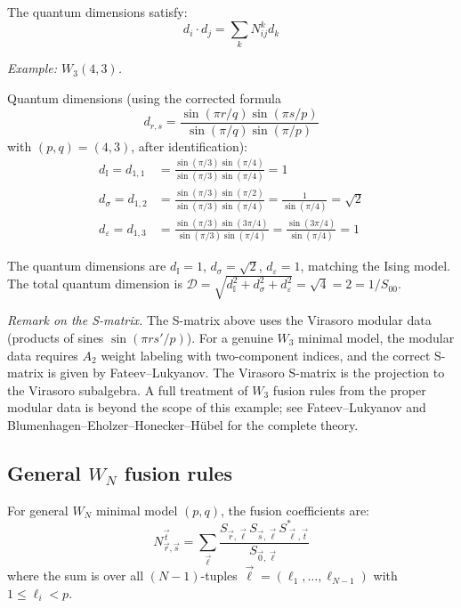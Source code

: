 \begin{verification}\label{verif:quantum-dim-mult}
The quantum dimensions satisfy:
\[d_i \cdot d_j = \sum_k N_{ij}^k d_k\]

\emph{Example: $W_3(4,3)$.}

Quantum dimensions (using the corrected formula
\[
d_{r,s} = \frac{\sin(\pi r/q)\sin(\pi s/p)}{\sin(\pi/q)\sin(\pi/p)}
\]
with $(p,q) = (4,3)$, after identification):
\begin{align}
d_{\mathbb{I}} = d_{1,1} &= \frac{\sin(\pi/3)\sin(\pi/4)}{\sin(\pi/3)\sin(\pi/4)} = 1 \\
d_{\sigma} = d_{1,2} &= \frac{\sin(\pi/3)\sin(\pi/2)}{\sin(\pi/3)\sin(\pi/4)} = \frac{1}{\sin(\pi/4)} = \sqrt{2} \\
d_{\varepsilon} = d_{1,3} &= \frac{\sin(\pi/3)\sin(3\pi/4)}{\sin(\pi/3)\sin(\pi/4)} = \frac{\sin(3\pi/4)}{\sin(\pi/4)} = 1
\end{align}

The quantum dimensions are $d_{\mathbb{I}} = 1$, $d_\sigma = \sqrt{2}$, $d_\varepsilon = 1$, matching the Ising model. The total quantum dimension is $\mathcal{D} = \sqrt{d_{\mathbb{I}}^2 + d_\sigma^2 + d_\varepsilon^2} = \sqrt{4} = 2 = 1/S_{00}$.

\emph{Remark on the S-matrix.} The S-matrix above uses the Virasoro modular data (products of sines $\sin(\pi r s'/p)$). For a genuine $W_3$ minimal model, the modular data requires $A_2$ weight labeling with two-component indices, and the correct S-matrix is given by Fateev--Lukyanov. The Virasoro S-matrix is the projection to the Virasoro subalgebra. A full treatment of $W_3$ fusion rules from the proper modular data is beyond the scope of this example; see Fateev--Lukyanov and Blumenhagen--Eholzer--Honecker--H\"ubel for the complete theory.
\end{verification}

\subsection{\texorpdfstring{General $W_N$ fusion rules}{General W N fusion rules}}
\label{subsec:wn-general-fusion}

\begin{theorem}\label{thm:wn-verlinde}
For general $W_N$ minimal model $(p,q)$, the fusion coefficients are:
\begin{equation}
N_{\vec{r},\vec{s}}^{\vec{t}} = \sum_{\vec{\ell}}
\frac{S_{\vec{r},\vec{\ell}} S_{\vec{s},\vec{\ell}} S_{\vec{\ell},\vec{t}}^*}{S_{\vec{0},\vec{\ell}}}
\end{equation}
where the sum is over all $(N-1)$-tuples $\vec{\ell} = (\ell_1, \ldots, \ell_{N-1})$
with $1 \leq \ell_i < p$.
\end{theorem}

